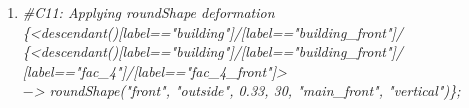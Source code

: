 \begin{enumerate}[label=(\alph*)]
    \item \textit{\#C11: Applying roundShape deformation} \\
            \qquad \textit{\{<descendant()[label=="building"]/[label=="building\_front"]/} \\
            \qquad \textit{\{<descendant()[label=="building"]/[label=="building\_front"]/} \\
            \qquad \textit{[label=="fac\_4"]/[label=="fac\_4\_front"]>} \\
            \qquad \textit{$-$> roundShape("front", "outside", 0.33, 30, "main\_front", "vertical")\};}
\end{enumerate}

\vspace{0.3cm}

\begin{figure}[h!]
	\centering
	\captionsetup{width=15cm}
	{}	
\end{figure}

